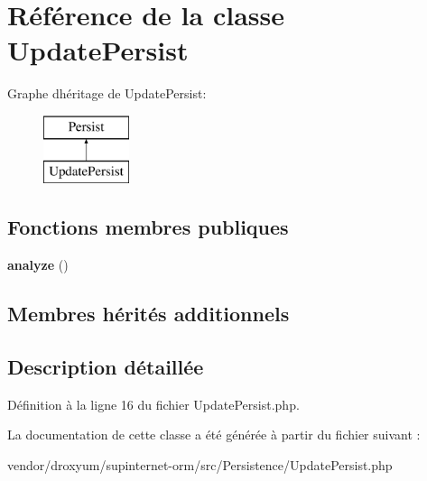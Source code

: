 \hypertarget{class_o_r_m_1_1_persistence_1_1_update_persist}{}\section{Référence de la classe Update\+Persist}
\label{class_o_r_m_1_1_persistence_1_1_update_persist}
Graphe d\textquotesingle{}héritage de Update\+Persist\+:\begin{figure}[H]
\begin{center}
\leavevmode
\includegraphics[height=2.000000cm]{class_o_r_m_1_1_persistence_1_1_update_persist}
\end{center}
\end{figure}
\subsection*{Fonctions membres publiques}
\begin{DoxyCompactItemize}
\item 
{\bfseries analyze} ()\hypertarget{class_o_r_m_1_1_persistence_1_1_update_persist_a9290b43f1b62e53c93e5a72c2cc8413f}{}\label{class_o_r_m_1_1_persistence_1_1_update_persist_a9290b43f1b62e53c93e5a72c2cc8413f}

\end{DoxyCompactItemize}
\subsection*{Membres hérités additionnels}


\subsection{Description détaillée}


Définition à la ligne 16 du fichier Update\+Persist.\+php.



La documentation de cette classe a été générée à partir du fichier suivant \+:\begin{DoxyCompactItemize}
\item 
vendor/droxyum/supinternet-\/orm/src/\+Persistence/Update\+Persist.\+php\end{DoxyCompactItemize}
